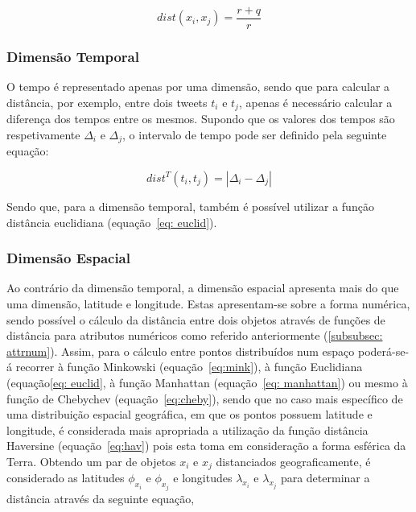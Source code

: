 \begin{equation}
 dist(x_{i}, x_{j}) =  \frac{r + q}{r}
\end{equation}

\subsubsection{Dimensão Temporal} \label{subsubsec: time}

O tempo é representado apenas por uma dimensão, sendo que para calcular a distância, por exemplo, entre dois tweets $ t_{i} $ e $ t_{j} $, apenas é necessário calcular a diferença dos tempos entre os mesmos. Supondo que os valores dos tempos são respetivamente $ \Delta_{i} $ e $ \Delta_{j} $, o intervalo de tempo pode ser definido pela seguinte equação:

\begin{equation}
dist^{T}( t_{i}, t_{j}) = |\Delta_{i} - \Delta_{j}|  
\end{equation}

Sendo que, para a dimensão temporal, também é possível utilizar a função distância euclidiana (equação~\ref{eq: euclid}).

\subsubsection{Dimensão Espacial} \label{subsubsec: space}

Ao contrário da dimensão temporal, a dimensão espacial apresenta mais do que uma dimensão, latitude e longitude. Estas apresentam-se sobre a forma numérica, sendo possível o cálculo da distância entre dois objetos através de funções de distância para atributos numéricos como referido anteriormente (\ref{subsubsec: attrnum}). Assim, para o cálculo entre pontos distribuídos num espaço poderá-se-á recorrer à função Minkowski (equação~\ref{eq:mink}), à função Euclidiana (equação\ref{eq: euclid}, à função Manhattan (equação~\ref{eq: manhattan}) ou mesmo à função de Chebychev (equação~\ref{eq:cheby}), sendo que no caso mais específico de uma distribuição espacial geográfica, em que os pontos possuem latitude e longitude, é considerada mais apropriada a utilização da função distância Haversine (equação~\ref{eq:hav}) pois esta toma em consideração a forma esférica da Terra.
Obtendo um par de objetos $ x_{i} $ e $ x_{j} $ distanciados geograficamente, é considerado as latitudes $ \phi_{x_{i}} $ e $ \phi_{x_{j}} $ e longitudes $ \lambda_{x_{i}} $ e $ \lambda_{x_{j}} $ para determinar a distância através da seguinte equação,

